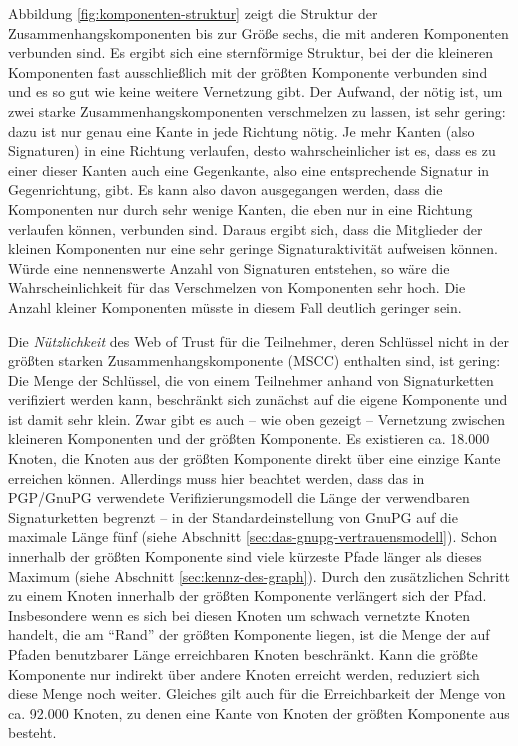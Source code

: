 Abbildung \ref{fig:komponenten-struktur} zeigt die Struktur der
Zusammenhangskomponenten bis zur Größe sechs, die mit anderen
Komponenten verbunden sind. Es ergibt sich eine sternförmige
Struktur, bei der die kleineren Komponenten fast ausschließlich mit
der größten Komponente verbunden sind und es so gut wie keine
weitere Vernetzung gibt. Der Aufwand, der nötig ist, um zwei starke
Zusammenhangskomponenten verschmelzen zu lassen, ist sehr gering: dazu
ist nur genau eine Kante in jede Richtung nötig. Je mehr Kanten
(also Signaturen) in eine Richtung verlaufen, desto wahrscheinlicher
ist es, dass es zu einer dieser Kanten auch eine Gegenkante, also eine
entsprechende Signatur in Gegenrichtung, gibt. Es kann also davon
ausgegangen werden, dass die Komponenten nur durch sehr wenige Kanten,
die eben nur in eine Richtung verlaufen können, verbunden
sind. Daraus ergibt sich, dass die Mitglieder der kleinen Komponenten
nur eine sehr geringe Signaturaktivität aufweisen können. Würde
eine nennenswerte Anzahl von Signaturen entstehen, so wäre die
Wahrscheinlichkeit für das Verschmelzen von Komponenten sehr
hoch. Die Anzahl kleiner Komponenten müsste in diesem Fall deutlich
geringer sein.

Die \emph{Nützlichkeit} des Web of Trust für die Teilnehmer, deren
Schlüssel nicht in der größten starken Zusammenhangskomponente
(MSCC)
enthalten sind, ist gering: Die Menge der Schlüssel, die von einem
Teilnehmer anhand von Signaturketten verifiziert werden kann,
beschränkt sich zunächst auf die eigene Komponente und ist damit
sehr klein. Zwar gibt es auch -- wie oben gezeigt -- Vernetzung
zwischen kleineren Komponenten und der größten Komponente. Es
existieren ca. 18.000 Knoten, die Knoten aus der größten Komponente
direkt über eine einzige Kante erreichen können. Allerdings muss
hier beachtet werden, dass das in PGP/GnuPG verwendete
Verifizierungsmodell die Länge der verwendbaren Signaturketten
begrenzt -- in der Standardeinstellung von GnuPG auf die maximale
Länge fünf (siehe Abschnitt
\ref{sec:das-gnupg-vertrauensmodell}). Schon innerhalb der größten
Komponente sind viele kürzeste Pfade länger als dieses Maximum
(siehe Abschnitt \ref{sec:kennz-des-graph}). Durch den zusätzlichen
Schritt zu einem Knoten innerhalb der größten Komponente
verlängert sich der Pfad. Insbesondere wenn es sich bei diesen
Knoten um schwach vernetzte Knoten handelt, die am ``Rand'' der
größten Komponente liegen, ist die Menge der auf Pfaden benutzbarer
Länge erreichbaren Knoten beschränkt. Kann die größte
Komponente nur indirekt über andere Knoten erreicht werden,
reduziert sich diese Menge noch weiter. Gleiches gilt auch für die
Erreichbarkeit der Menge von ca. 92.000 Knoten, zu denen eine Kante von
Knoten der größten Komponente aus besteht. 

